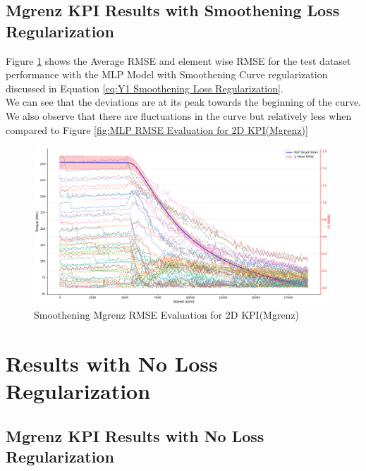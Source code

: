 \documentclass{report} %
\begin{document}
\subsection{Mgrenz \ac{KPI} Results with Smoothening Loss Regularization}\label{subsec:2D Mgrenz Results with Smoothening Loss Regularization}

Figure \ref{fig:Smoothening Mgrenz RMSE Evaluation for 2D KPI(Mgrenz)} shows the Average \ac{RMSE} and element wise \ac{RMSE} for the test dataset performance with the MLP Model with Smoothening Curve regularization discussed in Equation \ref{eq:Y1 Smoothening Loss Regularization}.\\
We can see that the deviations are at its peak towards the beginning of the curve. 
We also observe that there are fluctuations in the curve but relatively less when compared to Figure \ref{fig:MLP RMSE Evaluation for 2D KPI(Mgrenz)}\\
\begin{figure}[H]
    \centering
    \includegraphics[width=1\textwidth]{./ReportImages/RMSE_MLP_Smoothening_y1.png} 
    \caption{Smoothening Mgrenz \ac{RMSE} Evaluation for 2D KPI(Mgrenz)} 
    \label{fig:Smoothening Mgrenz RMSE Evaluation for 2D KPI(Mgrenz)}
\end{figure}

\section{Results with No Loss Regularization}\label{sec:Results with No Loss Regularization}

\subsection{Mgrenz \ac{KPI} Results with No Loss Regularization}\label{subsec:2D Mgrenz Results with No Loss Regularization}
\end{document}
